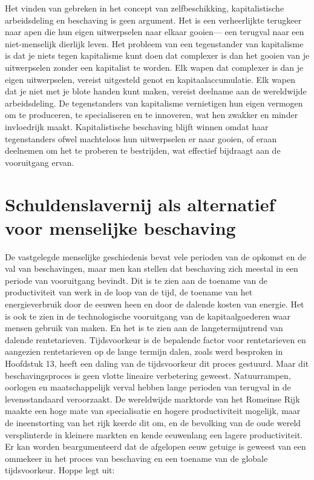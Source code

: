Het vinden van gebreken in het concept van zelfbeschikking, kapitalistische arbeidsdeling en beschaving is geen argument. Het is een verheerlijkte terugkeer naar apen die hun eigen uitwerpselen naar elkaar gooien--- een terugval naar een niet-menselijk dierlijk leven. Het probleem van een tegenstander van kapitalisme is dat je niets tegen kapitalisme kunt doen dat complexer is dan het gooien van je uitwerpselen zonder een kapitalist te worden. Elk wapen dat complexer is dan je eigen uitwerpselen, vereist uitgesteld genot en kapitaalaccumulatie. Elk wapen dat je niet met je blote handen kunt maken, vereist deelname aan de wereldwijde arbeidsdeling. De tegenstanders van kapitalisme vernietigen hun eigen vermogen om te produceren, te specialiseren en te innoveren, wat hen zwakker en minder invloedrijk maakt. Kapitalistische beschaving blijft winnen omdat haar tegenstanders ofwel machteloos hun uitwerpselen er naar gooien, of eraan deelnemen om het te proberen te bestrijden, wat effectief bijdraagt aan de vooruitgang ervan.

\hypertarget{schuldenslavernij-als-alternatief-voor-menselijke-beschaving}{%
\section{Schuldenslavernij als alternatief voor menselijke beschaving}\label{schuldenslavernij-als-alternatief-voor-menselijke-beschaving}}

De vastgelegde menselijke geschiedenis bevat vele perioden van de opkomst en de val van beschavingen, maar men kan stellen dat beschaving zich meestal in een periode van vooruitgang bevindt. Dit is te zien aan de toename van de productiviteit van werk in de loop van de tijd, de toename van het energieverbruik door de eeuwen heen en door de dalende kosten van energie. Het is ook te zien in de technologische vooruitgang van de kapitaalgoederen waar mensen gebruik van maken. En het is te zien aan de langetermijntrend van dalende rentetarieven. Tijdsvoorkeur is de bepalende factor voor rentetarieven en aangezien rentetarieven op de lange termijn dalen, zoals werd besproken in Hoofdstuk 13, heeft een daling van de tijdsvoorkeur dit proces gestuurd. Maar dit beschavingsproces is geen vlotte lineaire verbetering geweest. Natuurrampen, oorlogen en maatschappelijk verval hebben lange perioden van terugval in de levensstandaard veroorzaakt. De wereldwijde marktorde van het Romeinse Rijk maakte een hoge mate van specialisatie en hogere productiviteit mogelijk, maar de ineenstorting van het rijk keerde dit om, en de bevolking van de oude wereld versplinterde in kleinere markten en kende eeuwenlang een lagere productiviteit. Er kan worden beargumenteerd dat de afgelopen eeuw getuige is geweest van een ommekeer in het proces van beschaving en een toename van de globale tijdsvoorkeur. Hoppe legt uit:

